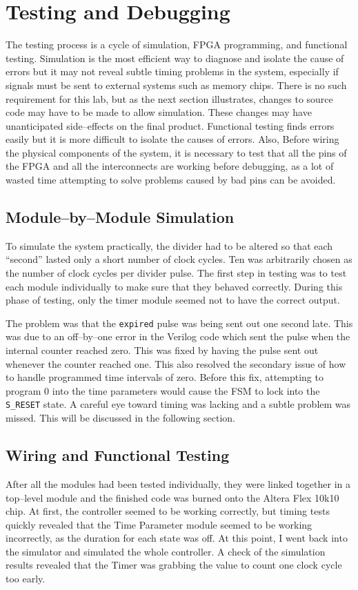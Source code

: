 \documentclass[12pt]{article}
\begin{document}
\section{Testing and Debugging}
	The testing process is a cycle of simulation, FPGA programming,
	and functional testing.  Simulation is the most efficient way to
	diagnose and isolate the cause of errors but it may not reveal subtle
	timing problems in the system, especially if signals must be sent to
	external systems such as memory chips.  There is no such requirement for
	this lab, but as the next section illustrates, changes to source code may
	have to be made to allow simulation.  These changes may have unanticipated
	side--effects on the final product.  Functional testing finds errors easily
	but it is more difficult to isolate the causes of errors.  Also, Before
	wiring the physical components of the system, it is necessary to test that
	all the pins of the FPGA and all the interconnects are working before
	debugging, as a lot of wasted time attempting to solve problems caused by
	bad pins can be avoided.

	\subsection{Module--by--Module Simulation}
	To simulate the system practically, the divider had to be altered so
	that each ``second'' lasted only a short number of clock cycles.  Ten
	was arbitrarily chosen as the number of clock cycles per divider pulse.
	The first step in testing was to test each module individually to make
	sure that they behaved correctly.  During this phase of testing, only
	the timer module seemed not to have the correct output.
	
	The problem was that the \texttt{expired} pulse was being sent out one
	second late.  This was due to an off--by--one error in the Verilog code
	which sent the pulse when the internal counter reached zero.  This was
	fixed by having the pulse sent out whenever the counter reached one.
	This also resolved the secondary issue of how to handle programmed
	time intervals of zero.  Before this fix, attempting to program 0 into the
	time parameters would cause the FSM to lock into the \texttt{S\_RESET}
	state.  A careful eye toward timing was lacking and a subtle problem was
	missed.  This will be discussed in the following section.

	\subsection{Wiring and Functional Testing}
	After all the modules had been tested individually, they were linked
	together in a top--level module and the finished code was burned onto
	the Altera Flex 10k10 chip.  At first, the controller seemed to be
	working correctly, but timing tests quickly revealed that the Time Parameter
	module seemed to be working incorrectly, as the duration for each state
	was off.  At this point, I went back into the simulator and simulated
	the whole controller.  A check of the simulation results revealed that
	the Timer was grabbing the value to count one clock cycle too early.
\end{document}

